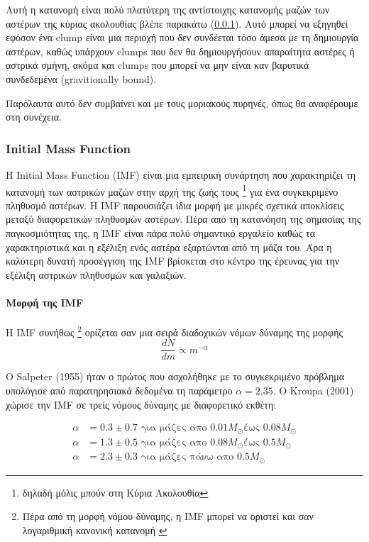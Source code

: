 \documentclass[a4paper,12pt]{memoir}
\newcommand{\sm}{$M_{\odot}$}
\begin{document}
Αυτή η κατανομή είναι πολύ πλατύτερη της αντίστοιχης κατανομής μαζών των αστέρων της κύριας ακολουθίας βλέπε παρακάτω (\ref{par:imf}). Αυτό μπορεί να εξηγηθεί εφόσον ένα clump είναι μια περιοχή που δεν συνδέεται τόσο άμεσα με τη δημιουργία αστέρων, καθώς υπάρχουν clumps που δεν θα δημιουργήσουν απαραίτητα αστέρες ή αστρικά σμήνη, ακόμα και clumps που μπορεί να μην είναι καν βαρυτικά συνδεδεμένα (gravitionally bound).

Παρόλαυτα αυτό δεν συμβαίνει και με τους μοριακούς πυρηνές, όπως θα αναφέρουμε στη συνέχεια. 

\subsubsection{Initial Mass Function}
\label{par:imf}
Η Initial Mass Function (IMF) είναι μια εμπειρική συνάρτηση που χαρακτηρίζει τη κατανομή των αστρικών μαζών στην αρχή της ζωής τους \footnote{δηλαδή μόλις μπούν στη Κύρια Ακολουθία} για ένα συγκεκριμένο πληθυσμό αστέρων. Η IMF παρουσιάζει ίδια μορφή με μικρές σχετικά αποκλίσεις μεταξύ διαφορετικών πληθυσμών αστέρων. 
Πέρα από τη κατανόηση της σημασίας της παγκοσμιότητας της, η IMF είναι πάρα πολύ σημαντικό εργαλείο καθώς τα χαρακτηριστικά και η εξέλιξη ενός αστέρα εξαρτώνται από τη μάζα του. 
Άρα η καλύτερη δυνατή προσέγγιση της IMF βρίσκεται στο κέντρο της έρευνας για την εξέλιξη αστρικών πληθυσμών και γαλαξιών.

\paragraph{Μορφή της IMF}
Η IMF συνήθως \footnote{Πέρα από τη μορφή νόμου δύναμης, η IMF μπορεί να οριστεί και σαν λογαριθμική κανονική κατανομή \cite{salpeter_initial_2005}} ορίζεται σαν μια σειρά διαδοχικών νόμων δύναμης της μορφής 
\begin{equation}
\frac{dN}{dm} \propto m^{-\alpha}
\end{equation}

Ο Salpeter (1955) ήταν ο πρώτος που ασχολήθηκε με το συγκεκριμένο πρόβλημα υπολόγισε από παρατηρησιακά δεδομένα τη παράμετρο $\alpha=2.35$.
Ο Kroupa (2001) χώρισε την IMF σε τρείς νόμους δύναμης με διαφορετικό εκθέτη:

\begin{align}
\alpha&=0.3 \pm 0.7 \text{ για μάζες απο $0.01$\sm έως $0.08$\sm} \\
\alpha&=1.3 \pm 0.5 \text{ για μάζες απο $0.08$\sm έως $0.5$\sm} \\
\alpha&=2.3 \pm 0.3 \text{ για μάζες πάνω απο $0.5$\sm}
\end{align}
\end{document}
